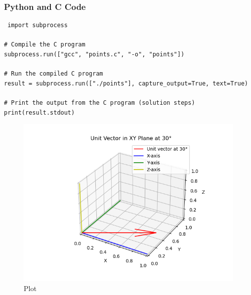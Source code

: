 \documentclass{beamer}
\begin{document}
\begin{frame}[fragile]
\frametitle{Python and C Code}

\begin{lstlisting}
 import subprocess

# Compile the C program
subprocess.run(["gcc", "points.c", "-o", "points"])

# Run the compiled C program
result = subprocess.run(["./points"], capture_output=True, text=True)

# Print the output from the C program (solution steps)
print(result.stdout) 

\end{lstlisting}

\end{frame}

\begin{figure}
    \centering
    \includegraphics[width=0.8\columnwidth]{Fig2.png}
    \caption{Plot}
    \label{fig:placeholder}
\end{figure}
\end{document}
